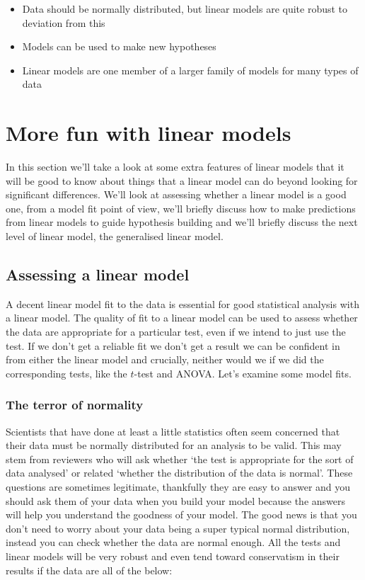 \documentclass[
]{book}
\providecommand{\tightlist}{%
  \setlength{\itemsep}{0pt}\setlength{\parskip}{0pt}}
\begin{document}
\begin{itemize}
\tightlist
\item
  Data should be normally distributed, but linear models are quite robust to deviation from this
\item
  Models can be used to make new hypotheses
\item
  Linear models are one member of a larger family of models for many types of data
\end{itemize}

\hypertarget{more-fun-with-linear-models}{%
\chapter{More fun with linear models}\label{more-fun-with-linear-models}}

In this section we'll take a look at some extra features of linear models that it will be good to know about things that a linear model can do beyond looking for significant differences. We'll look at assessing whether a linear model is a good one, from a model fit point of view, we'll briefly discuss how to make predictions from linear models to guide hypothesis building and we'll briefly discuss the next level of linear model, the generalised linear model.

\hypertarget{assessing-a-linear-model}{%
\section{Assessing a linear model}\label{assessing-a-linear-model}}

A decent linear model fit to the data is essential for good statistical analysis with a linear model. The quality of fit to a linear model can be used to assess whether the data are appropriate for a particular test, even if we intend to just use the test. If we don't get a reliable fit we don't get a result we can be confident in from either the linear model and crucially, neither would we if we did the corresponding tests, like the \(t\)-test and ANOVA. Let's examine some model fits.

\hypertarget{the-terror-of-normality}{%
\subsection{The terror of normality}\label{the-terror-of-normality}}

Scientists that have done at least a little statistics often seem concerned that their data must be normally distributed for an analysis to be valid. This may stem from reviewers who will ask whether `the test is appropriate for the sort of data analysed' or related `whether the distribution of the data is normal'. These questions are sometimes legitimate, thankfully they are easy to answer and you should ask them of your data when you build your model because the answers will help you understand the goodness of your model. The good news is that you don't need to worry about your data being a super typical normal distribution, instead you can check whether the data are normal enough. All the tests and linear models will be very robust and even tend toward conservatism in their results if the data are all of the below:
\end{document}
